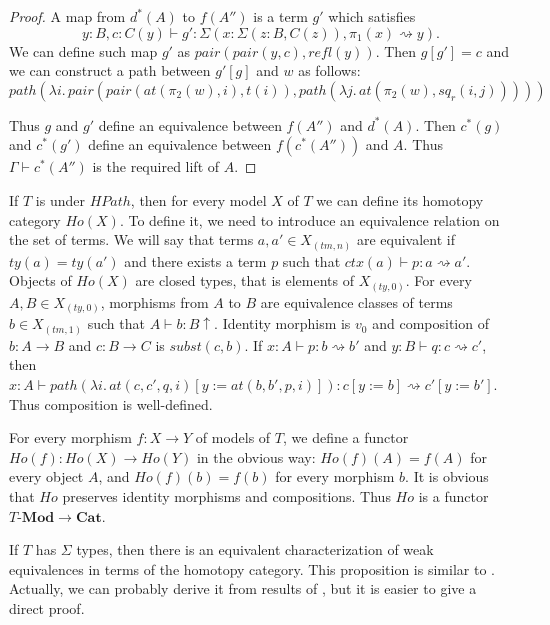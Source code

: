 \documentclass{mscs}
\newcommand{\repl}{:=}
\newcommand{\idtype}{\rightsquigarrow}
\newcommand{\cat}[1]{\mathbf{#1}}
\newcommand{\Mod}[1]{#1\text{-}\cat{Mod}}
\numberwithin{figure}{section}
\begin{document}
\begin{proof}
A map from $d^*(A)$ to $f(A'')$ is a term $g'$ which satisfies
\[ y : B, c : C(y) \vdash g' : \Sigma(x : \Sigma(z : B, C(z)), \pi_1(x) \idtype y). \]
We can define such map $g'$ as $pair(pair(y,c),refl(y))$.
Then $g[g'] = c$ and we can construct a path between $g'[g]$ and $w$ as follows:
\[ path(\lambda i.\,pair(pair(at(\pi_2(w),i), t(i)), path(\lambda j.\,at(\pi_2(w),sq_r(i,j))))) \]

Thus $g$ and $g'$ define an equivalence between $f(A'')$ and $d^*(A)$.
Then $c^*(g)$ and $c^*(g')$ define an equivalence between $f(c^*(A''))$ and $A$.
Thus $\Gamma \vdash c^*(A'')$ is the required lift of $A$.
\end{proof}

If $T$ is under $HPath$, then for every model $X$ of $T$ we can define its homotopy category $Ho(X)$.
To define it, we need to introduce an equivalence relation on the set of terms.
We will say that terms $a,a' \in X_{(tm,n)}$ are equivalent if $ty(a) = ty(a')$ and there exists a term $p$ such that $ctx(a) \vdash p : a \idtype a'$.
Objects of $Ho(X)$ are closed types, that is elements of $X_{(ty,0)}$.
For every $A,B \in X_{(ty,0)}$, morphisms from $A$ to $B$ are equivalence classes of terms $b \in X_{(tm,1)}$ such that $A \vdash b : B\!\uparrow$.
Identity morphism is $v_0$ and composition of $b : A \to B$ and $c : B \to C$ is $subst(c,b)$.
If $x : A \vdash p : b \idtype b'$ and $y : B \vdash q : c \idtype c'$, then $x : A \vdash path(\lambda i.\,at(c,c',q,i)[y \repl at(b,b',p,i)]) : c[y \repl b] \idtype c'[y \repl b']$.
Thus composition is well-defined.

For every morphism $f : X \to Y$ of models of $T$, we define a functor $Ho(f) : Ho(X) \to Ho(Y)$ in the obvious way:
$Ho(f)(A) = f(A)$ for every object $A$, and $Ho(f)(b) = f(b)$ for every morphism $b$.
It is obvious that $Ho$ preserves identity morphisms and compositions.
Thus $Ho$ is a functor $\Mod{T} \to \cat{Cat}$.

If $T$ has $\Sigma$ types, then there is an equivalent characterization of weak equivalences in terms of the homotopy category.
This proposition is similar to \cite[Th\'eor\`eme 3.25]{cis10b}.
Actually, we can probably derive it from results of \cite{cis10b}, but it is easier to give a direct proof.
\end{document}
